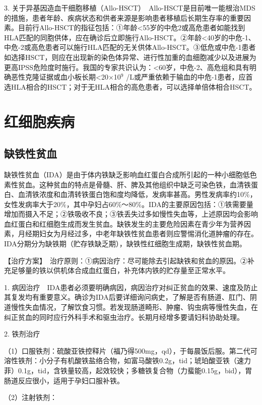 3.
关于异基因造血干细胞移植（Allo-HSCT）　Allo-HSCT是目前唯一能根治MDS的措施，患者年龄、疾病状态和供者来源是影响患者移植后长期生存率的重要因素。目前行Allo-HSCT的指征包括：①年龄<55岁的中危2或高危患者如能找到HLA匹配的同胞供体，应在确诊后立即施行Allo-HSCT。②年龄<40岁的中危-1、中危-2或高危患者可以施行HLA匹配的无关供体Allo-HSCT。③低危或中危-1患者如选择HSCT，则应在出现新的染色体异常、进行性加重的血细胞减少以及进展为更高IPSS危险度时施行。我国的专家共识认为：<60岁，中危-2、高危组和具有明确恶性克隆证据或血小板长期<20×10$^{9}$
/L或严重依赖于输血的中危-1患者，应首选HLA相合的HSCT；对于无HLA相合的高危患者，可以选择单倍体相合HSCT。

\section{红细胞疾病}

\subsection{缺铁性贫血}

缺铁性贫血（IDA）是由于体内铁缺乏影响血红蛋白合成所引起的一种小细胞低色素性贫血。这种贫血的特点是骨髓、肝、脾及其他组织中缺乏可染色铁，血清铁蛋白、血清铁浓度和血清转铁蛋白饱和度均降低，发病率甚高。男性发病率约10\%，女性发病率大于20\%，其中孕妇占60\%～80\%。IDA的主要原因包括：①铁需要量增加而摄入不足；②铁吸收不良；③铁丢失过多如慢性失血等，上述原因均会影响血红蛋白和红细胞生成而发生贫血。缺铁发生的主要危险因素在青少年为营养因素，月经期妇女为月经过多，中老年缺铁性贫血患者则应警惕消化道肿瘤的存在。IDA分期分为缺铁期（贮存铁缺乏期），缺铁性红细胞生成期，缺铁性贫血期。

【治疗方案】　治疗原则：①病因治疗：尽可能除去引起缺铁和贫血的原因。②补充足够量的铁以供机体合成血红蛋白，补充体内铁的贮存量至正常水平。

1.
病因治疗　IDA患者必须要明确病因，病因治疗对纠正贫血的效果、速度及防止其复发均有重要意义。确诊为IDA后要详细询问病史，了解是否有肠道、肛门、阴道慢性失血情况，了解饮食习惯。若发现肠道畸形、肿瘤、钩虫病等慢性失血，在纠正贫血的同时应行外科手术和驱虫治疗。长期月经增多要请妇科协助处理。

2. 铁剂治疗

（1）口服铁剂：硫酸亚铁控释片（福乃得500mg，qd），于每晨饭后服。第二代可溶性铁剂：小分子有机酸铁盐络合物，如富马酸铁0.2g，tid；琥珀酸亚铁（速力菲）0.1g，tid，含铁量较高，起效较快；多糖铁复合物（力蜚能0.15g，bid），胃肠道反应很小，适用于孕妇口服补铁。

（2）注射铁剂：

